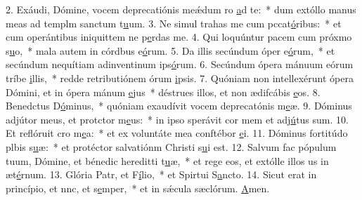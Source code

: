 2. Exáudi, Dómine, vocem deprecatiónis meǽdum ro \uline{a}d te:~* dum extóllo manus meas ad templm sanctum t\uline{u}um.
3. Ne simul trahas me cum pccat\uline{ó}ribus:~* et cum operántibus iniquittem ne p\uline{e}rdas me.
4. Qui loquúntur pacem cum próxmo s\uline{u}o,~* mala autem in córdbus e\uline{ó}rum.
5. Da illis secúndum óper e\uline{ó}rum,~* et secúndum nequítiam adinventinum ips\uline{ó}rum.
6. Secúndum ópera mánuum eórum tríbe \uline{i}llis,~* redde retributiónem órum \uline{i}psis.
7. Quóniam non intellexérunt ópera Dómini, et in ópera mánum \uline{e}jus~* déstrues illos, et non ædifcábis \uline{e}os.
8. Benedctus D\uline{ó}minus,~* quóniam exaudívit vocem deprecatónis m\uline{e}æ.
9. Dóminus adjútor meus, et protctor m\uline{e}us:~* in ipso sperávit cor mem et adj\uline{ú}tus sum.
10. Et reflóruit cro m\uline{e}a:~* et ex voluntáte mea conftébor \uline{e}i.
11. Dóminus fortitúdo plbis s\uline{u}æ:~* et protéctor salvatiónm Christi s\uline{u}i est.
12. Salvum fac pópulum tuum, Dómine, et bénedic hereditti t\uline{u}æ,~* et rege eos, et extólle illos us in æt\uline{é}rnum.
13. Glória Patr, et F\uline{í}lio,~* et Spirtui S\uline{a}ncto.
14. Sicut erat in princípio, et nnc, et s\uline{e}mper,~* et in sǽcula sæclórum. \uline{A}men.
